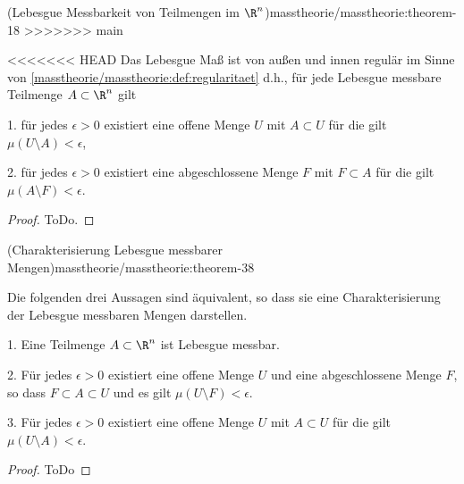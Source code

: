 \documentclass[letterpaper,10pt,english]{jupyterBook}
\begin{document}
\begin{theorem}{(Lebesgue Messbarkeit von Teilmengen im \protect\(\R^n\protect\))}{masstheorie/masstheorie:theorem-18}
>>>>>>> main



\par
<<<<<<< HEAD
Das Lebesgue Maß ist von außen und innen regulär im Sinne von \cref{masstheorie/masstheorie:def:regularitaet}  d.h., für jede Lebesgue messbare Teilmenge \(A \subset \R^n\) gilt

\par
1. für jedes \(\epsilon > 0\) existiert eine offene Menge \(U\) mit \(A \subset U\) für die gilt \(\mu(U \setminus A) < \epsilon\),

\par
2. für jedes \(\epsilon > 0\) existiert eine abgeschlossene Menge \(F\) mit \(F \subset A\) für die gilt \(\mu(A \setminus F) < \epsilon\).
\end{theorem}

\begin{proof}
 ToDo.
\end{proof}
\begin{theorem}{(Charakterisierung Lebesgue messbarer Mengen)}{masstheorie/masstheorie:theorem-38}



\par
Die folgenden drei Aussagen sind äquivalent, so dass sie eine Charakterisierung der Lebesgue messbaren Mengen darstellen.

\par
1. Eine Teilmenge \(A \subset \R^n\) ist Lebesgue messbar.

\par
2. Für jedes \(\epsilon > 0\) existiert eine offene Menge \(U\) und eine abgeschlossene Menge \(F\), so dass \(F \subset A \subset U\) und es gilt \(\mu(U \setminus F) < \epsilon\).

\par
3. Für jedes \(\epsilon > 0\) existiert eine offene Menge \(U\) mit \(A \subset U\) für die gilt \(\mu(U \setminus A) < \epsilon\).
\end{theorem}

\begin{proof}
 ToDo
\end{proof}
\end{document}
